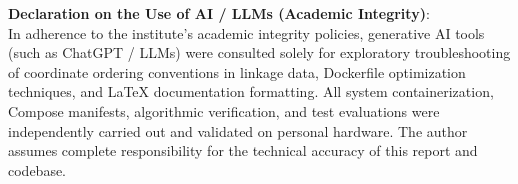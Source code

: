 \documentclass[11pt,a4paper]{article}
\begin{document}
\vspace{0.4cm}
\begin{tcolorbox}[colback=boxbg, colframe=primarycolor!70, boxrule=0.6pt, arc=3pt, left=8pt, right=8pt, top=4pt, bottom=4pt]
\small
\textbf{Declaration on the Use of AI / LLMs (Academic Integrity)}:\\
In adherence to the institute's academic integrity policies, generative AI tools (such as ChatGPT / LLMs) were consulted solely for exploratory troubleshooting of coordinate ordering conventions in linkage data, Dockerfile optimization techniques, and \LaTeX{} documentation formatting. All system containerization, Compose manifests, algorithmic verification, and test evaluations were independently carried out and validated on personal hardware. The author assumes complete responsibility for the technical accuracy of this report and codebase.
\end{tcolorbox}
\end{document}
